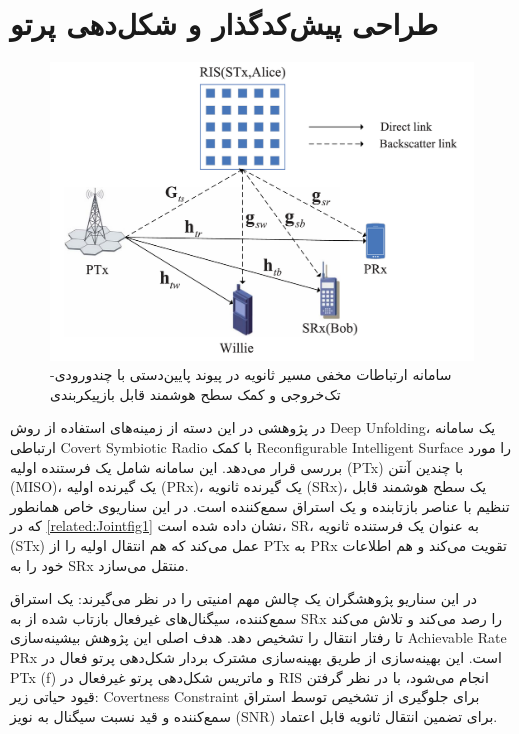 \section{طراحی پیش‌کدگذار و شکل‌دهی پرتو}
\begin{figure}
	\centering
	\includegraphics[width=0.6\linewidth]{./Pic/JointActive_related_fig1}
	\caption[ سامانه ارتباطات مخفی مسیر ثانویه در پیوند پایین‌دستی با چندورودی-تک‌خروجی و کمک سطح هوشمند قابل بازپیکربندی]{سامانه ارتباطات مخفی مسیر ثانویه در پیوند پایین‌دستی با چندورودی-تک‌خروجی و کمک سطح هوشمند قابل بازپیکربندی \cite{JointActive}}
	\label{related:Jointfig1}
\end{figure}
در پژوهشی در این دسته از زمینه‌های استفاده از روش 
\gls{Deep Unfolding}،
یک سامانه ارتباطی
\gls{Covert Symbiotic Radio}
 با کمک 
\gls{Reconfigurable Intelligent Surface}
 را مورد بررسی قرار می‌دهد. این سامانه شامل یک فرستنده اولیه 
(\gls{PTx})
  با چندین آنتن 
(\gls{MISO})،
  یک گیرنده اولیه 
(\gls{PRx})،
   یک گیرنده ثانویه 
(\gls{SRx})،
 یک سطح هوشمند قابل تنظیم با عناصر بازتابنده و یک استراق سمع‌کننده است. در این سناریوی خاص همانطور که در 
\autoref{related:Jointfig1}
 نشان داده شده است،
\gls{SR}، 
  به عنوان یک فرستنده ثانویه 
(\gls{STx})
   عمل می‌کند که هم انتقال اولیه را از PTx به PRx تقویت می‌کند و هم اطلاعات خود را به SRx منتقل می‌سازد.
   
در این سناریو پژوهشگران یک چالش مهم امنیتی را در نظر می‌گیرند: یک استراق سمع‌کننده، سیگنال‌های غیرفعال بازتاب شده از 
 به SRx را رصد می‌کند و تلاش می‌کند تا رفتار انتقال را تشخیص دهد. هدف اصلی این پژوهش بیشینه‌سازی
\gls{Achievable Rate} PRx 
 است. این بهینه‌سازی از طریق بهینه‌سازی مشترک بردار شکل‌دهی پرتو فعال در PTx (f) و ماتریس شکل‌دهی پرتو غیرفعال در RIS انجام می‌شود، با در نظر گرفتن قیود حیاتی زیر:
\gls{Covertness Constraint}
 برای جلوگیری از تشخیص توسط استراق سمع‌کننده و قید نسبت سیگنال به نویز 
(\gls{SNR})
  برای تضمین انتقال ثانویه قابل اعتماد.
  
